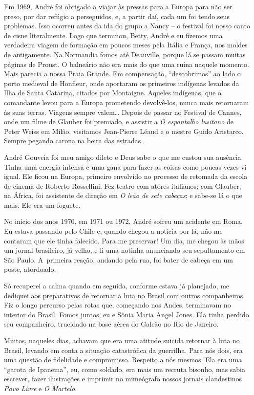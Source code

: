 Em 1969, André foi obrigado a viajar às pressas para a Europa para não
ser preso, por dar refúgio a perseguidos, e, a partir daí, cada um
foi tendo seus problemas. Isso ocorreu antes da ida do grupo a
Nancy -- o festival foi nosso canto de cisne literalmente. Logo que
terminou, Betty, André e eu fizemos uma verdadeira viagem de formação em
poucos meses pela Itália e França, nos moldes de antigamente. Na
Normandia fomos até Deauville, porque lá se passam muitas páginas de
Proust. O balneário não era mais do que uma ruína naquele momento. Mais
parecia a nossa Praia Grande. Em compensação,
“descobrimos” ao lado o porto medieval de Honfleur, onde aportaram os
primeiros indígenas levados da Ilha de Santa Catarina, citados
por Montaigne. Aqueles indígenas, que o comandante levou para a Europa
prometendo devolvê-los, nunca mais retornaram às suas terras. Viagens
sempre valem\ldots{} Depois de passar no Festival de Cannes, onde um filme de
Glauber foi premiado, e assistir a {\it O espantalho lusitano} de Peter
Weiss em Milão, visitamos Jean-Pierre Léaud e o mestre Guido Aristarco.
Sempre pegando carona na beira das estradas.

André Gouveia foi meu amigo dileto e Deus sabe o que me custou sua
ausência. Tinha uma energia intensa e uma gana para fazer as coisas como
poucas vezes vi igual. Ele ficou na Europa, primeiro envolvido no
processo de retomada da escola de cinema de Roberto Rossellini. Fez
teatro com atores italianos; com Glauber, na África, foi assistente de
direção em {\it O leão de sete cabeças}; e sabe-se lá o que mais. Ele
era um foguete.

No início dos anos 1970, em 1971 ou 1972, André sofreu um acidente em Roma.
Eu estava passando pelo Chile e, quando chegou a notícia por lá, não me
contaram que ele tinha falecido. Para me preservar! Um dia, me chegou às
mãos um jornal brasileiro, já velho, e li uma notinha anunciando seu
sepultamento em São Paulo. A~primeira reação, andando pela rua, foi
bater de cabeça em um poste, atordoado.

Só recuperei a calma quando em seguida, conforme estava já planejado, me
dediquei aos preparativos de retornar à luta no Brasil com outros
companheiros. Fiz o longo percurso pelas rotas que, começando nos Andes,
terminavam no interior do Brasil. Fomos juntos, eu e Sônia Maria Angel
Jones. Ela tinha perdido seu companheiro, trucidado na base aérea do
Galeão no Rio de Janeiro.

Muitos, naqueles dias, achavam que era uma atitude suicida retornar à
luta no Brasil, levando em conta a situação catastrófica da guerrilha.
Para nós dois, era uma questão de fidelidade e compromisso. Respeito a
nós mesmos. Ela era uma “garota de Ipanema”, eu, como soldado, era mais um
recruta bisonho, mas sabia escrever, fazer ilustrações e imprimir no
mimeógrafo nossos jornais clandestinos {\it Povo Livre} e {\it O
Martelo}.

